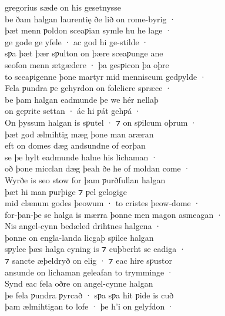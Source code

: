 \documentclass[10pt]{book}
\begin{document}
\settowidth{}

\begin{center}
\parbox{\pagelen}{
gregorius s\ae{}de on his gesetnysse \\
be ðam halgan laurentię ðe lið on rome-byrig · \\
þ\ae{}t menn ƿoldon sceaƿian symle hu he lage · \\
ge gode ge yfele · ac god hi ge-stilde · \\
sƿa þ\ae{}t þ\ae{}r sƿulton on þ\ae{}re sceaƿunge ane \\
seofon menn \ae{}tg\ae{}dere · þa gesƿicon þa oþre \\
to sceaƿigenne þone martyr mid menniscum gedƿylde · \\
Fela ƿundra ƿe gehyrdon on folclicre spr\ae{}ce · \\
be þam halgan eadmunde þe we h\'er nellaþ \\
on geƿrite settan · \'ac hi ƿ\'at gehƿ\'a · \\
On þyssum halgan is sƿutel · ⁊ on sƿilcum oþrum · \\
þ\ae{}t god \ae{}lmihtig m\ae{}g þone man ar\ae{}ran \\
eft on domes d\ae{}g andsundne of eorþan \\
se þe hylt eadmunde halne his lichaman · \\
oð þone micclan d\ae{}g þeah ðe he of moldan come · \\
Wyrðe is seo stow for þam ƿurðfullan halgan \\
þ\ae{}t hi man ƿurþige ⁊ ƿel gelogige \\
mid cl\ae{}num godes þeowum · to cristes þeow-dome · \\
for-þan-þe se halga is m\ae{}rra þonne men magon asmeagan · \\
Nis angel-cynn bed\ae{}led drihtnes halgena · \\
þonne on engla-landa licgaþ sƿilce halgan \\
sƿylce þ\ae{}s halga cyning is ⁊ cuþberht se eadiga · \\
⁊ sancte \ae{}þeldryð on elig · ⁊ eac hire sƿustor \\
ansunde on lichaman geleafan to trymminge · \\
Synd eac fela oðre on angel-cynne halgan \\
þe fela ƿundra ƿyrcað · sƿa sƿa hit ƿide is cuð \\
þam \ae{}lmihtigan to lofe · þe h'i on gelyfdon · \\
}
\end{center}
\end{document}
